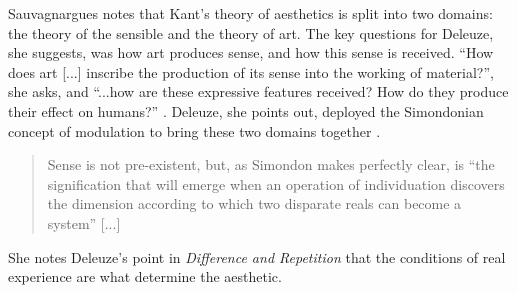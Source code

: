         Sauvagnargues notes that Kant's theory of aesthetics is split into two domains: the theory of the sensible and the theory of art. The key questions for Deleuze, she suggests, was how art produces sense, and how this sense is received. “How does art [...] inscribe the production of its sense into the working of material?”, she asks, and “...how are these expressive features received? How do they produce their effect on humans?” \citep[p.66]{SauvagnarguesArtmchns2016}. Deleuze, she points out, deployed the Simondonian concept of modulation to bring these two domains together \citep[p.62]{SauvagnarguesArtmchns2016}.

        \begin{quote}
            Sense is not pre-existent, but, as Simondon makes perfectly clear, is “the signification that will emerge when an operation of individuation discovers the dimension according to which two disparate reals can become a system” [...] \citep[p.68]{SauvagnarguesArtmchns2016}
        \end{quote}

        She notes Deleuze's point in \emph{Difference and Repetition} that the conditions of real experience are what determine the aesthetic.

